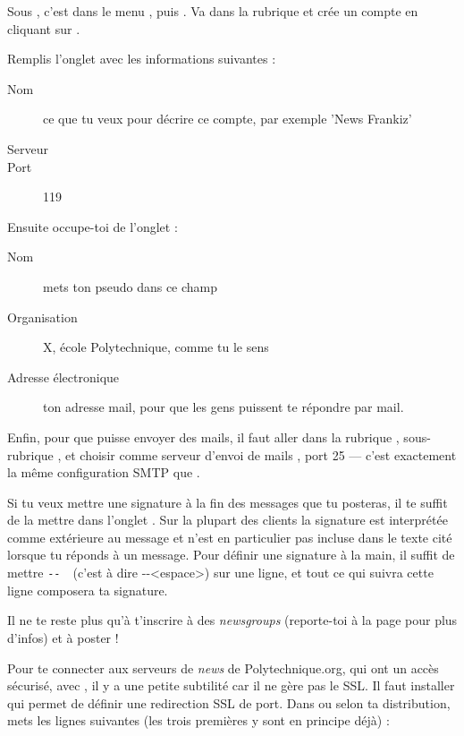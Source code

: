 Sous , c'est dans le menu , puis . Va dans la rubrique  et
crée un compte en cliquant sur .


Remplis l'onglet  avec les informations suivantes :
\begin{description}
  \item[Nom] ce que tu veux pour décrire ce compte, par exemple 'News Frankiz'
  \item[Serveur] 
  \item[Port] 119
\end{description}
Ensuite occupe-toi de l'onglet  :
\begin{description}
  \item[Nom] mets ton pseudo dans ce champ
  \item[Organisation] X, école Polytechnique, comme tu le sens
  \item[Adresse électronique] ton adresse mail, pour que les gens puissent te répondre par mail.
\end{description}

Enfin, pour que  puisse envoyer des mails, il faut aller
dans la rubrique , sous-rubrique , et choisir comme serveur d'envoi de mails
, port 25 --- c'est exactement la m\^eme
configuration SMTP que .

Si tu veux mettre une signature à la fin des messages que tu
posteras, il te suffit de la mettre dans l'onglet .
Sur la plupart des clients la signature est interprétée comme
extérieure au message et n'est en particulier pas incluse dans le
texte cité lorsque tu réponds à un message. Pour définir une
signature à la main, il suffit de mettre \verb*+-- +\ (c'est à dire
-{}-<espace>) sur une ligne, et tout ce qui suivra cette ligne
composera ta signature.

Il ne te reste plus qu'à t'inscrire à des \emph{newsgroups} (reporte-toi à la page \pageref{newsgroups} pour plus d'infos) et à poster !

Pour te connecter aux serveurs de \emph{news} de Polytechnique.org, qui ont un accès sécurisé, avec , il y a une petite subtilité car il
ne gère pas le SSL. Il faut installer  qui permet de définir une redirection SSL de port. Dans  ou
 selon ta distribution, mets les lignes suivantes (les trois premières y sont en principe déjà) :

